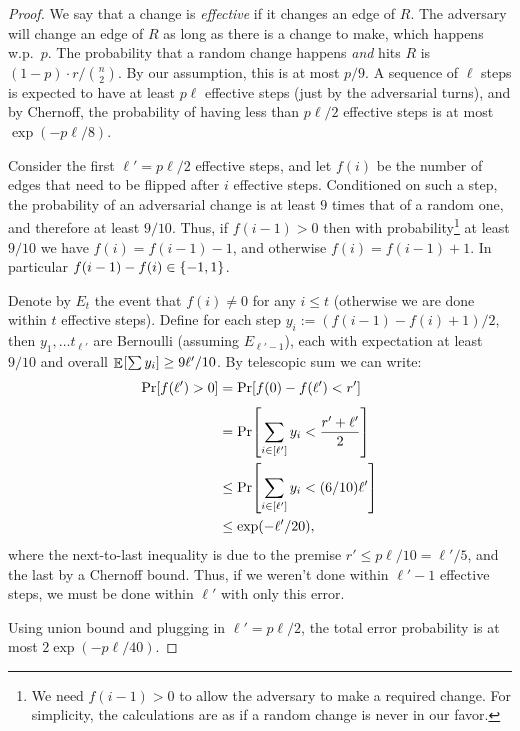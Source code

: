 \documentclass[letter,11pt]{article}
\begin{document}
\begin{proof}
	We say that a change is \emph{effective} if it changes an edge of $R$.
	The adversary will change an edge of $R$ as long as there is a change to make,
    which happens w.p.~$p$.
    The probability that a random change happens \emph{and} hits $R$ is $(1-p)\cdot r / \binom{n}{2}$. By our assumption, this is at most $p/9$.
    A sequence of $\ell$ steps is expected to have at least $p\ell$ effective steps (just by the adversarial turns), and by Chernoff, the probability of having less than $p\ell /2$ effective steps is at most $\exp\left(-p\ell/8\right)$.

    Consider the first $\ell' = p\ell/2$ effective steps, and let $f(i)$ be the number of edges that need to be flipped after $i$ effective steps.
    Conditioned on such a step, the probability of an adversarial change is at least $9$ times that of a random one, and therefore at least $9/10$.
    Thus, if $f(i-1) > 0$ then with probability\footnote{We need $f(i-1) > 0$ to allow the adversary to make a required change. For simplicity, the calculations are as if a random change is never in our favor.} at least $9/10$ we have $f(i) = f(i-1) - 1$, and otherwise $f(i) = f(i-1) +1$. In particular $f(i-1) - f(i) \in \{-1,1\}$.
    
    Denote by $E_t$ the event that $f(i) \neq 0$ for any $i\leq t$ (otherwise we are done within $t$ effective steps).
    Define for each step $y_i := (f(i-1) - f(i) + 1)/2$, then $y_1,\dots t_{\ell'}$ are Bernoulli (assuming $E_{\ell' - 1}$), each with expectation at least $9/10$ and overall $\Expc{}{\sum y_i} \geq 9\ell'/10$. By telescopic sum we can write:
    \[
    \begin{aligned}
        \Prob{}{f(\ell') > 0}
        &= \Prob{}{f(0) - f(\ell') < r'}\\
        &= \Prob{}{\sum_{i\in[\ell']} y_i
        < \frac{r' + \ell'}{2}}\\
        &\leq \Prob{}{\sum_{i\in[\ell']} y_i
        < (6/10)\ell'} \\
        &\leq \exp\left(-\ell'/20\right) ,
    \end{aligned}
    \]
    where the next-to-last inequality is due to the premise $r' \leq p\ell/10 = \ell'/5$, and the last by a Chernoff bound.
    Thus, if we weren't done within $\ell'-1$ effective steps, we must be done within $\ell'$ with only this error.
    
    Using union bound and plugging in $\ell' = p\ell/2$, the total error probability is at most $2\exp\left(-p\ell /40\right)$.
\end{proof}
\end{document}
